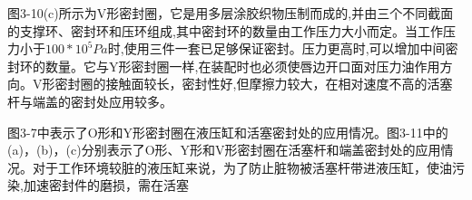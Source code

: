 \indent 图3-10(c)所示为V形密封圈，它是用多层涂胶织物压制而成的,并由三个不同截面的支撑环、密封环和压环组成,其中密封环的数量由工作压力大小而定。当工作压力小于$100*10^5 Pa$时,使用三件一套已足够保证密封。压力更高时,可以增加中间密封环的数量。它与Y形密封圈一样,在装配时也必须使唇边开口面对压力油作用方向。V形密封圈的接触面较长，密封性好,但摩擦力较大，在相对速度不高的活塞杆与端盖的密封处应用较多。

\indent 图3-7中表示了O形和Y形密封圈在液压缸和活塞密封处的应用情况。图3-11中的(a)，(b)，(c)分别表示了O形、Y形和V形密封圈在活塞杆和端盖密封处的应用情况。对于工作环境较脏的液压缸来说，为了防止脏物被活塞杆带进液压缸，使油污染,加速密封件的磨损，需在活塞




